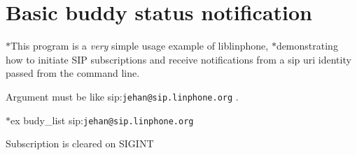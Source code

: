 \section{Basic buddy status notification}
\label{group__buddy__tutorials}
$\ast$\-This program is a {\itshape very} simple usage example of liblinphone, $\ast$demonstrating how to initiate S\-I\-P subscriptions and receive notifications from a sip uri identity passed from the command line. \par
Argument must be like sip\-:{\tt jehan@sip.\-linphone.\-org} . \par
 $\ast$ex budy\-\_\-list sip\-:{\tt jehan@sip.\-linphone.\-org} \par
Subscription is cleared on S\-I\-G\-I\-N\-T \par
 
